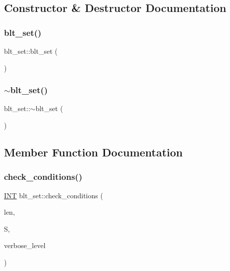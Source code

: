 \subsection{Constructor \& Destructor Documentation}
\mbox{\label{classblt__set_a04973f08aa5193284ac3a51ef9d2d322}} 
\subsubsection{\texorpdfstring{blt\+\_\+set()}{blt\_set()}}
{\footnotesize\ttfamily blt\+\_\+set\+::blt\+\_\+set (\begin{DoxyParamCaption}{ }\end{DoxyParamCaption})}

\mbox{\label{classblt__set_adbf61747988c80615e72b179298ed19f}} 
\subsubsection{\texorpdfstring{$\sim$blt\+\_\+set()}{~blt\_set()}}
{\footnotesize\ttfamily blt\+\_\+set\+::$\sim$blt\+\_\+set (\begin{DoxyParamCaption}{ }\end{DoxyParamCaption})}



\subsection{Member Function Documentation}
\mbox{\label{classblt__set_ad51895e1ed3f1541ed735bc06befd9c1}} 
\subsubsection{\texorpdfstring{check\+\_\+conditions()}{check\_conditions()}}
{\footnotesize\ttfamily \mbox{\hyperlink{galois_8h_a09fddde158a3a20bd2dcadb609de11dc}{I\+NT}} blt\+\_\+set\+::check\+\_\+conditions (\begin{DoxyParamCaption}\item[{\mbox{\hyperlink{galois_8h_a09fddde158a3a20bd2dcadb609de11dc}{I\+NT}}}]{len,  }\item[{\mbox{\hyperlink{galois_8h_a09fddde158a3a20bd2dcadb609de11dc}{I\+NT}} $\ast$}]{S,  }\item[{\mbox{\hyperlink{galois_8h_a09fddde158a3a20bd2dcadb609de11dc}{I\+NT}}}]{verbose\+\_\+level }\end{DoxyParamCaption})}

